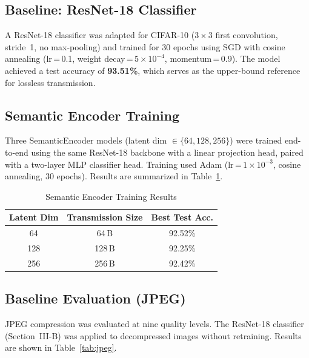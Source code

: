 \documentclass[conference]{IEEEtran}
\begin{document}
\subsection{Baseline: ResNet-18 Classifier}

A ResNet-18 classifier was adapted for CIFAR-10 ($3{\times}3$ first
convolution, stride~1, no max-pooling) and trained for 30 epochs using SGD
with cosine annealing (lr\,=\,0.1, weight decay\,=\,$5{\times}10^{-4}$,
momentum\,=\,0.9).
The model achieved a test accuracy of \textbf{93.51\%}, which serves as the
upper-bound reference for lossless transmission.

\subsection{Semantic Encoder Training}

Three SemanticEncoder models (latent dim $\in \{64, 128, 256\}$) were trained
end-to-end using the same ResNet-18 backbone with a linear projection head,
paired with a two-layer MLP classifier head.
Training used Adam (lr\,=\,$1{\times}10^{-3}$, cosine annealing, 30 epochs).
Results are summarized in Table~\ref{tab:semantic_train}.

\begin{table}[htbp]
\caption{Semantic Encoder Training Results}
\label{tab:semantic_train}
\begin{center}
\begin{tabular}{ccc}
\toprule
\textbf{Latent Dim} & \textbf{Transmission Size} & \textbf{Best Test Acc.} \\
\midrule
64  & 64\,B  & 92.52\% \\
128 & 128\,B & 92.25\% \\
256 & 256\,B & 92.42\% \\
\bottomrule
\end{tabular}
\end{center}
\end{table}

\subsection{Baseline Evaluation (JPEG)}

JPEG compression was evaluated at nine quality levels.
The ResNet-18 classifier (Section~III-B) was applied to decompressed images
without retraining. Results are shown in Table~\ref{tab:jpeg}.
\end{document}
